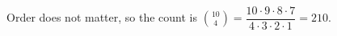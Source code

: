 Order does not matter, so the count is $\binom{10}{4}=\dfrac{10\cdot9\cdot8\cdot7}{4\cdot3\cdot2\cdot1}=\boxed{210}$.
